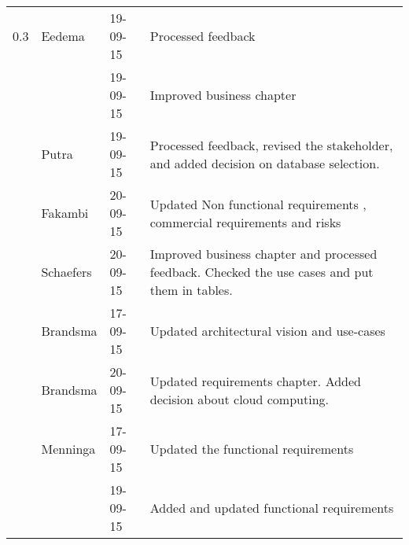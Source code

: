 \begin{longtable}{L{} L{} L{} L{}}
	0.3              & Eedema                & 19-09-15      & Processed feedback                                                                                                                                                                                                         \\
	                 &                       & 19-09-15      & Improved business chapter                                                                                                                                                                                                  \\
	                 & Putra                 & 19-09-15      & Processed feedback, revised the stakeholder, and added decision on database selection.                                                                                                                                     \\
					 & Fakambi               & 20-09-15     & Updated Non functional requirements , commercial requirements and risks \\
					 & Schaefers             & 20-09-15      & Improved business chapter and processed feedback. Checked the use cases and put them in tables.                                                                                                                            \\	                 
					 & Brandsma              & 17-09-15      & Updated architectural vision and use-cases                                                                                                                                                                                 \\
	                 & Brandsma              & 20-09-15      & Updated requirements chapter. Added decision about cloud computing.                                                                                                                                                        \\
					 & Menninga              & 17-09-15      & Updated the functional requirements                                                                                                                                                                                        \\
					 & 		                 & 19-09-15      & Added and updated functional requirements                                                                                                                                                                                  \\

\end{longtable}
